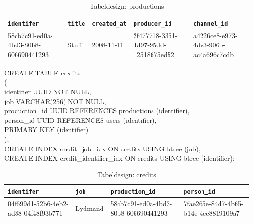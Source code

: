 \begin{table}[ht]
    \begin{tabularx}{\textwidth}{|X|X|X|X|X|}
        \hline
        \texttt{\textbf{identifer}} &  \texttt{\textbf{title}} & \texttt{\textbf{created\_at}} & \texttt{\textbf{producer\_id}} & \texttt{\textbf{channel\_id}}\\
        \hline
        58cb7c91-ed0a-4bd3-80b8-606690441293 & Stuff & 2008-11-11 & 2f477718-3351-4d97-95dd-12518675ed52 &  a4226ce8-e973-4de3-906b-ac4a696c7cdb\\
        \hline
    \end{tabularx}
    \caption{Tabeldesign: productions}
    \label{tab:productions_table}
\end{table}



\noindent
CREATE TABLE credits\\
(\\
    identifier    UUID         NOT NULL,\\
    job           VARCHAR(256) NOT NULL,\\
    production\_id UUID REFERENCES productions (identifier),\\
    person\_id     UUID REFERENCES users (identifier),\\
    PRIMARY KEY (identifier)\\
);\\
CREATE INDEX credit\_job\_idx ON credits USING btree (job);\\
CREATE INDEX credit\_identifier\_idx ON credits USING btree (identifier);\\


\begin{table}[ht]
    \begin{tabularx}{\textwidth}{|X|X|X|X|}
        \hline
        \texttt{\textbf{identifer}} &  \texttt{\textbf{job}} & \texttt{\textbf{production\_id}} & \texttt{\textbf{person\_id}}\\
        \hline
        04f699d1-52b6-4eb2-ad88-04f48f93b771 & Lydmand & 58cb7c91-ed0a-4bd3-80b8-606690441293 & 7fae265e-84d7-4b65-b14e-4ec8819109a7\\
        \hline
    \end{tabularx}
    \caption{Tabeldesign: credits}
    \label{tab:credits_table}
\end{table}

